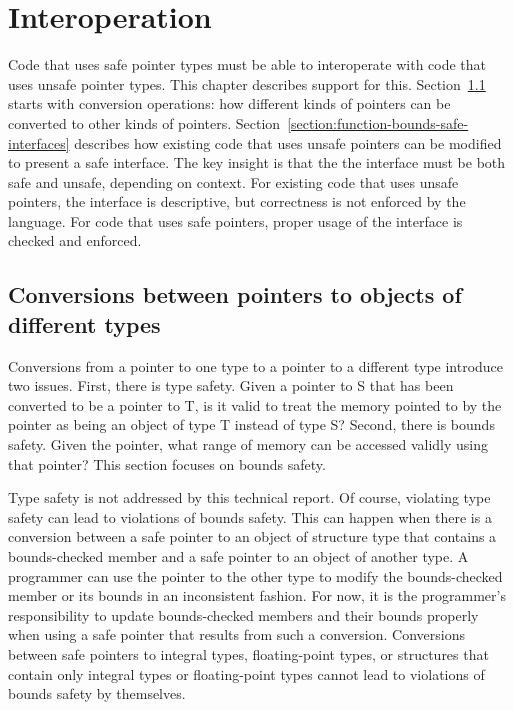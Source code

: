 
\newcommand{\dynamicboundscast}{\texttt{dynamic\_bounds\_cast}}
\newcommand{\dynamicboundscastinst}[2]{\texttt{dynamic\_bounds\_cast<#1>#2}}
\newcommand{\assumeboundscast}{\texttt{assume\_bounds\_cast}}
\newcommand{\assumeboundscastinst}[2]{\texttt{assume\_bounds\_cast<#1>#2}}

\chapter{Interoperation}
\label{chapter:interoperation}

Code that uses safe pointer types must be able to interoperate with
code that uses unsafe pointer types.  This chapter describes support
for this.  Section~\ref{section:pointer-casting} starts with
conversion operations: how different kinds of pointers can
be converted to other kinds of pointers.  
Section~\ref{section:function-bounds-safe-interfaces}
describes how existing code that uses unsafe pointers can be modified
to present a safe interface.  The key insight is that the
the interface must be both safe and unsafe, depending on context.
For existing code that uses unsafe pointers, the interface is descriptive,
but correctness is not enforced by the language.  For code that uses safe
pointers, proper usage of the interface is checked and enforced.

\section{Conversions between pointers to objects of different types}
\label{section:pointer-casting}

Conversions from a pointer to one type to a pointer to a different type
introduce two issues. First, there is type safety. Given a pointer to S
that has been converted to be a pointer to T, is it valid to treat the
memory pointed to by the pointer as being an object of type T instead of
type S? Second, there is bounds safety. Given the pointer, what range of
memory can be accessed validly using that pointer? This section focuses on
bounds safety.

Type safety is not addressed by this technical report. Of course, violating
type safety can lead to violations of bounds safety. This can happen
when there is a conversion between a safe pointer to an object of
structure type that contains a bounds-checked member and a safe pointer
to an object of another type. A programmer can use the pointer to the
other type to modify the bounds-checked member or its bounds in an
inconsistent fashion. For now, it is the programmer's responsibility to
update bounds-checked members and their bounds properly when using a
safe pointer that results from such a conversion. Conversions between
safe pointers to integral types, floating-point types, or structures that
contain only integral types or floating-point types cannot lead to
violations of bounds safety by themselves.


